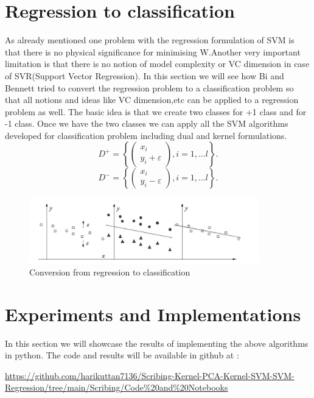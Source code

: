 \documentclass[../main.tex]{subfiles}
\begin{document}
\section{Regression to classification}
As already mentioned one problem with the regression formulation of SVM is that there is no physical significance for minimising W.Another very important limitation is that there is no notion of model complexity or VC dimension in case of SVR(Support Vector Regression). In this section we will see how Bi and Bennett tried to convert the regression problem to a classification problem so that all notions and ideas like VC dimension,etc can be applied to a regression problem as well.
\newline
The basic idea is that we create two classes for +1 class and for -1 class. Once we have the two classes we can apply all the SVM algorithms developed for classification problem including dual and kernel formulations.
$$D^{+}=\left\{\left(\begin{array}{l}
x_{i} \\
y_{i}+\varepsilon
\end{array}\right), i=1, \ldots l\right\} .$$
$$D^{-}=\left\{\left(\begin{array}{l}
x_{i} \\
y_{i}-\varepsilon
\end{array}\right), i=1, \ldots l\right\} .$$
    \begin{figure}[htp]
    \centering
    \includegraphics[width=10cm]{H5.png}
    \caption{Conversion from regression to classification}
    \label{Conversion from regression to classification}
    \end{figure}
\section{Experiments and Implementations}
In this section we will showcase the results of implementing the above algorithms in python. The code and results will be available in github at :

\url {https://github.com/harikuttan7136/Scribing-Kernel-PCA-Kernel-SVM-SVM-Regression/tree/main/Scribing/Code%20and%20Notebooks}
\end{document}
